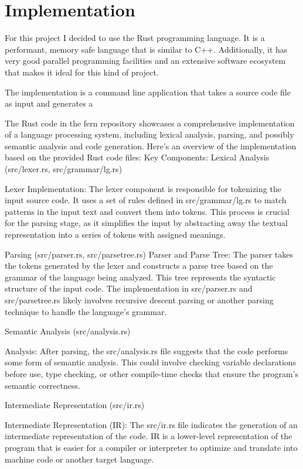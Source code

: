 \chapter{Implementation} \label{implementation}

For this project I decided to use the Rust programming language. It is a
performant, memory safe language that is similar to C++. Additionally, it has
very good parallel programming facilities and an extensive software ecosystem
that makes it ideal for this kind of project.

The implementation is a command line application that takes a source code file
as input and generates a 

The Rust code in the fern repository showcases a comprehensive implementation of
a language processing system, including lexical analysis, parsing, and possibly
semantic analysis and code generation. Here's an overview of the implementation
based on the provided Rust code files: Key Components:
Lexical Analysis (src/lexer.rs, src/grammar/lg.rs)

    Lexer Implementation: The lexer component is responsible for tokenizing
the input source code. It uses a set of rules defined in src/grammar/lg.rs to
match patterns in the input text and convert them into tokens. This process is
crucial for the parsing stage, as it simplifies the input by abstracting away
the textual representation into a series of tokens with assigned meanings.

Parsing (src/parser.rs, src/parsetree.rs)
    Parser and Parse Tree: The parser takes the tokens generated by the lexer
    and constructs a parse tree based on the grammar of the language being
    analyzed. This tree represents the syntactic structure of the input code.
    The implementation in src/parser.rs and src/parsetree.rs likely involves
    recursive descent parsing or another parsing technique to handle the
    language's grammar.

Semantic Analysis (src/analysis.rs)

    Analysis: After parsing, the src/analysis.rs file suggests that the code
performs some form of semantic analysis. This could involve checking variable
declarations before use, type checking, or other compile-time checks that ensure
the program's semantic correctness.

Intermediate Representation (src/ir.rs)

    Intermediate Representation (IR): The src/ir.rs file indicates the
generation of an intermediate representation of the code. IR is a lower-level
representation of the program that is easier for a compiler or interpreter to
optimize and translate into machine code or another target language.

